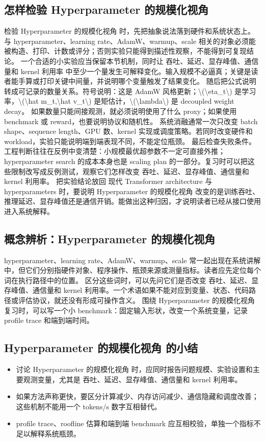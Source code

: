 \documentclass[a4paper]{article}
\begin{document}
\subsection{怎样检验 Hyperparameter 的规模化视角}
检验 Hyperparameter 的规模化视角 时，先把抽象说法落到硬件和系统状态上。与 hyperparameter、learning rate、AdamW、warmup、scale 相关的对象必须能被构造、打印、计数或评分；否则实验只能得到描述性观察，不能得到可复现结论。
一个合适的小实验应当保留本节机制，同时让 吞吐、延迟、显存峰值、通信量和 kernel 利用率 中至少一个量发生可解释变化。输入规模不必逼真；关键是读者能手算或打印关键中间量，并说明哪个变量触发了结果变化。
随后把公式说明转成可记录的数量关系。符号说明：这是 AdamW 风格更新；\textbackslash{}(\textbackslash{}eta\_t\textbackslash{}) 是学习率，\textbackslash{}(\textbackslash{}hat m\_t,\textbackslash{}hat v\_t\textbackslash{}) 是矩估计，\textbackslash{}(\textbackslash{}lambda\textbackslash{}) 是 decoupled weight decay。 如果数量只能间接观测，就必须说明使用了什么 proxy；如果使用 benchmark 或 reward，也要说明协议和随机性。
系统消融通常一次只改变 batch shape、sequence length、GPU 数、kernel 实现或调度策略。若同时改变硬件和 workload，实验只能说明端到端表现不同，不能定位瓶颈。
最后检查失败条件。工程判断往往在反例中变清楚：小规模最优超参数不一定可直接外推；hyperparameter search 的成本本身也是 scaling plan 的一部分。复习时可以把这些限制改写成反例测试，观察它们怎样改变 吞吐、延迟、显存峰值、通信量和 kernel 利用率。
把实验结论放回 现代 Transformer architecture 与 hyperparameters 时，要说明 Hyperparameter 的规模化视角 改变的是训练吞吐、推理延迟、显存峰值还是通信开销。能做出这种归因，才说明读者已经从接口使用进入系统解释。
\subsection{概念辨析：Hyperparameter 的规模化视角}
hyperparameter、learning rate、AdamW、warmup、scale 常一起出现在系统讲解中，但它们分别指硬件对象、程序操作、瓶颈来源或测量指标。读者应先定位每个词在执行路径中的位置。
区分这些词时，可以先问它们是否改变 吞吐、延迟、显存峰值、通信量和 kernel 利用率。一个术语如果不能对应到变量、状态、代码路径或评估协议，就还没有形成可操作含义。
围绕 Hyperparameter 的规模化视角 复习时，可以写一个小 benchmark：固定输入形状，改变一个系统变量，记录 profile trace 和端到端时间。
\subsection{Hyperparameter 的规模化视角 的小结}
\begin{itemize}
\item 讨论 Hyperparameter 的规模化视角 时，应同时报告问题规模、实验设置和主要观测变量，尤其是 吞吐、延迟、显存峰值、通信量和 kernel 利用率。
\item 如果方法声称更快，要区分计算减少、内存访问减少、通信隐藏和调度改善；这些机制不能用一个 tokens/s 数字互相替代。
\item profile trace、roofline 估算和端到端 benchmark 应互相校验，单独一个指标不足以解释系统瓶颈。
\end{itemize}
\end{document}
